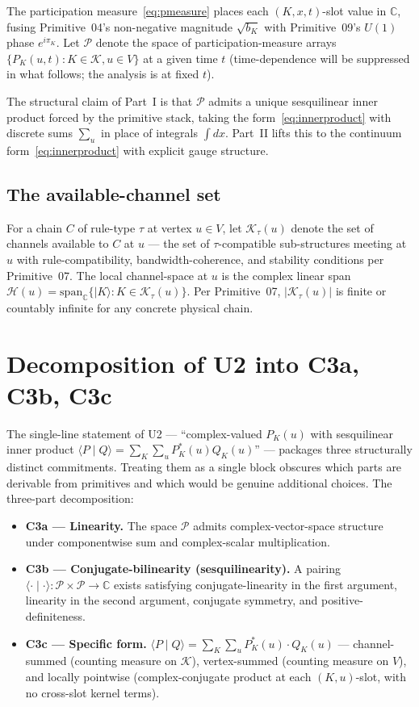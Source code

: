\documentclass[11pt,a4paper]{article}
\begin{document}
The participation measure~\eqref{eq:pmeasure} places each $(K, x, t)$-slot value in $\mathbb{C}$, fusing Primitive~04's non-negative magnitude $\sqrt{b_K}$ with Primitive~09's $U(1)$ phase $e^{i \pi_K}$. Let $\mathcal{P}$ denote the space of participation-measure arrays $\{P_K(u, t) : K \in \mathcal{K}, u \in V\}$ at a given time $t$ (time-dependence will be suppressed in what follows; the analysis is at fixed $t$).

The structural claim of Part~I is that $\mathcal{P}$ admits a unique sesquilinear inner product forced by the primitive stack, taking the form~\eqref{eq:innerproduct} with discrete sums $\sum_u$ in place of integrals $\int dx$. Part~II lifts this to the continuum form~\eqref{eq:innerproduct} with explicit gauge structure.

\subsection{The available-channel set}

For a chain $C$ of rule-type $\tau$ at vertex $u \in V$, let $\mathcal{K}_\tau(u)$ denote the set of channels available to $C$ at $u$ --- the set of $\tau$-compatible sub-structures meeting at $u$ with rule-compatibility, bandwidth-coherence, and stability conditions per Primitive~07. The local channel-space at $u$ is the complex linear span $\mathcal{H}(u) = \mathrm{span}_\mathbb{C}\{|K\rangle : K \in \mathcal{K}_\tau(u)\}$. Per Primitive~07, $|\mathcal{K}_\tau(u)|$ is finite or countably infinite for any concrete physical chain.

\section{Decomposition of U2 into C3a, C3b, C3c}\label{sec:decomp}

The single-line statement of U2 --- ``complex-valued $P_K(u)$ with sesquilinear inner product $\langle P \mid Q \rangle = \sum_K \sum_u P_K^*(u) Q_K(u)$'' --- packages three structurally distinct commitments. Treating them as a single block obscures which parts are derivable from primitives and which would be genuine additional choices. The three-part decomposition:

\begin{itemize}
  \item \textbf{C3a --- Linearity.} The space $\mathcal{P}$ admits complex-vector-space structure under componentwise sum and complex-scalar multiplication.
  \item \textbf{C3b --- Conjugate-bilinearity (sesquilinearity).} A pairing $\langle \cdot \mid \cdot \rangle : \mathcal{P} \times \mathcal{P} \to \mathbb{C}$ exists satisfying conjugate-linearity in the first argument, linearity in the second argument, conjugate symmetry, and positive-definiteness.
  \item \textbf{C3c --- Specific form.} $\langle P \mid Q \rangle = \sum_K \sum_u P_K^*(u) \cdot Q_K(u)$ --- channel-summed (counting measure on $\mathcal{K}$), vertex-summed (counting measure on $V$), and locally pointwise (complex-conjugate product at each $(K, u)$-slot, with no cross-slot kernel terms).
\end{itemize}
\end{document}
